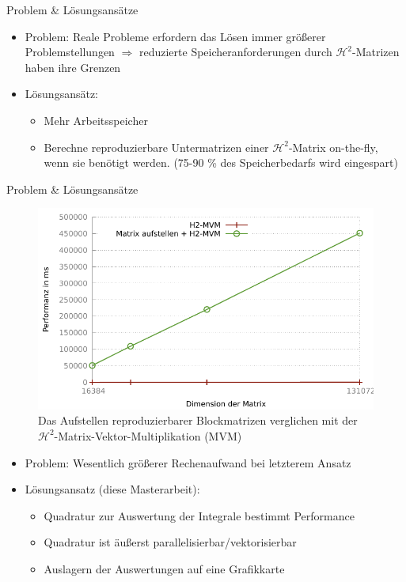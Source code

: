 \documentclass[10pt]{beamer}
\begin{document}
\begin{frame}{Problem \& Lösungsansätze}
  \begin{itemize}
    \item Problem: Reale Probleme erfordern das Lösen immer größerer
          Problemstellungen \(\Rightarrow\) reduzierte Speicheranforderungen
          durch \(\mathcal{H}^2\)-Matrizen haben ihre Grenzen
    \item Lösungsansätz:
    \begin{itemize}
      \item Mehr Arbeitsspeicher
      \item Berechne reproduzierbare Untermatrizen einer
            \(\mathcal{H}^2\)-Matrix on-the-fly, wenn sie benötigt werden.
            (75-90 \% des Speicherbedarfs wird eingespart)
    \end{itemize}
  \end{itemize}
\end{frame}

\begin{frame}{Problem \& Lösungsansätze}
  \begin{figure}
    \centering
    \includegraphics[width=.5\linewidth]{figures/fg-performance-h2-gca.pdf}
    \caption{Das Aufstellen reproduzierbarer Blockmatrizen verglichen mit der
             \(\mathcal{H}^2\)-Matrix-Vektor-Multiplikation (MVM)}

  \end{figure}
  \begin{itemize}
    \item Problem: Wesentlich größerer Rechenaufwand bei letzterem Ansatz
    \item Lösungsansatz (diese Masterarbeit):
    \begin{itemize}
      \item Quadratur zur Auswertung der Integrale bestimmt Performance
      \item Quadratur ist äußerst parallelisierbar/vektorisierbar
      \item Auslagern der Auswertungen auf eine Grafikkarte
    \end{itemize}
  \end{itemize}
\end{frame}
\end{document}
